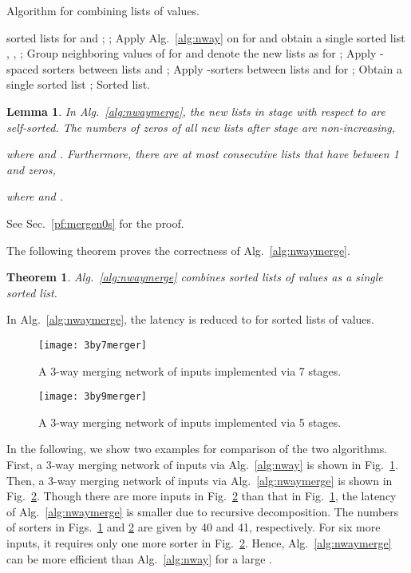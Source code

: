 \documentclass[10pt,journal,cspaper,compsoc]{IEEEtran}
\newtheorem{thm}{Theorem}[section]
\newtheorem{lemma}{Lemma}[section]
\begin{document}
\begin{algorithm}[!tp]
  \caption{Algorithm for combining  lists of  values.}
  \begin{algorithmic}
    \REQUIRE  sorted lists  for  and ;
    \STATE ;
            \STATE Apply Alg.~\ref{alg:nway} on   for  and obtain a single sorted list ,
            , ;
        \ENDFOR
{}
            \STATE Group  neighboring values of  for  and denote the new lists as  for ;
                \STATE Apply -spaced sorters between lists  and ;
            \ENDFOR
            \STATE Apply -sorters between lists  and  for ;
            \STATE Obtain a single sorted list   ;
        \ENDFOR
    \ENDFOR
    \RETURN Sorted list.
  \end{algorithmic}
  \label{alg:nwaymerge}
\end{algorithm}

\begin{lemma}
  In Alg.~\ref{alg:nwaymerge}, the new lists in stage  with respect to  are self-sorted. The numbers of zeros of all new lists after stage  are non-increasing,
  
  where  and . Furthermore, there are at most  consecutive lists that have between 1 and  zeros,
  
  where  and .
\label{lm:mergen0s}
\end{lemma}
See Sec.~\ref{pf:mergen0s} for the proof.

The following theorem proves the correctness of Alg.~\ref{alg:nwaymerge}.
\begin{thm}
  Alg.~\ref{alg:nwaymerge} combines  sorted lists of  values as a single sorted list.
  \label{thm:nwaymerge}
\end{thm}
In Alg.~\ref{alg:nwaymerge}, the latency is reduced to  for  sorted lists of  values.

\begin{figure}[!t]
\centering
\texttt{[image: 3by7merger]}
\caption{A 3-way merging network of  inputs implemented via 7 stages.}
\label{fig:3by7merger}
\end{figure}

\begin{figure}[!t]
\centering
\texttt{[image: 3by9merger]}
\caption{A 3-way merging network of  inputs implemented via 5 stages.}
\label{fig:3by9merger}
\end{figure}

In the following, we show two examples for comparison of the two algorithms.
First, a 3-way merging network of  inputs via Alg.~\ref{alg:nway} is shown in Fig.~\ref{fig:3by7merger}.
Then, a 3-way merging network of  inputs via Alg.~\ref{alg:nwaymerge} is shown in Fig.~\ref{fig:3by9merger}. Though there are more inputs in Fig.~\ref{fig:3by9merger} than that in Fig.~\ref{fig:3by7merger}, the latency of Alg.~\ref{alg:nwaymerge} is smaller due to recursive decomposition. The numbers of sorters in Figs.~\ref{fig:3by7merger} and \ref{fig:3by9merger} are given by 40 and 41, respectively. For six more inputs, it requires only one more sorter in Fig.~\ref{fig:3by9merger}. Hence, Alg.~\ref{alg:nwaymerge} can be more efficient than Alg.~\ref{alg:nway} for a large .
\end{document}

